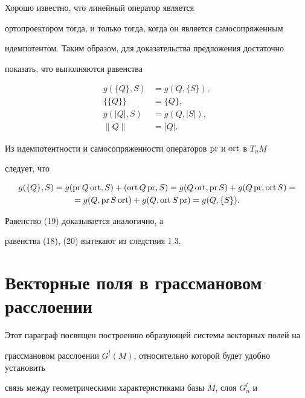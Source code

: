 \begin{pf} Хорошо известно, что линейный оператор является


ортопроектором тогда, и только тогда, когда он является самосопряженным


идемпотентом. Таким образом, для доказательства предложения достаточно


показать, что выполняются равенства


\begin{align}


g(\{ Q\} ,S)&=g(Q,\{ S\} ),\\


\{ \{ Q\} \} &=\{ Q\} ,\\


g(|Q|,S)&=g(Q,|S|),\\


\|Q\|&=|Q|.


\end{align}


Из идемпотентности и самосопряженности операторов $\operatorname{pr} $ и $\operatorname{ort} $ в $T_uM$


следует, что


\begin{gather*}


g(\{ Q\} ,S)=g(\pr Q\ort ,S)+(\ort Q\pr ,S)=g(Q\ort ,\pr S)+g(Q\pr ,\ort S)=\\


=g(Q,\pr S\ort )+g(Q,\ort S\pr )=g(Q,\{ S\} ).


\end{gather*}


Равенство (19) доказывается аналогично, а


равенства (18), (20) вытекают из следствия 1.3.


\end{pf}





\section{Векторные поля в грассмановом расслоении}





Этот параграф посвящен построению образующей системы векторных полей на


грассмановом расслоении $G^l(M)$, относительно которой будет удобно установить


связь между геометрическими характеристиками базы $M$, слоя $G^l_n$ и


